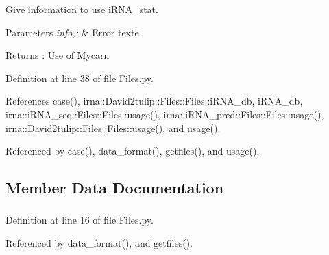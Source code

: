 \-Give information to use \hyperlink{namespaceirna_1_1iRNA__stat_1_1iRNA__stat}{i\-R\-N\-A\-\_\-stat}. 


\begin{DoxyParams}{\-Parameters}
{\em info,\-:} & \-Error texte \\
\hline
\end{DoxyParams}
\begin{DoxyReturn}{\-Returns}
\-: \-Use of \-Mycarn 
\end{DoxyReturn}


\-Definition at line 38 of file \-Files.\-py.



\-References case(), irna\-::\-David2tulip\-::\-Files\-::\-Files\-::i\-R\-N\-A\-\_\-db, i\-R\-N\-A\-\_\-db, irna\-::i\-R\-N\-A\-\_\-seq\-::\-Files\-::\-Files\-::usage(), irna\-::i\-R\-N\-A\-\_\-pred\-::\-Files\-::\-Files\-::usage(), irna\-::\-David2tulip\-::\-Files\-::\-Files\-::usage(), and usage().



\-Referenced by case(), data\-\_\-format(), getfiles(), and usage().



\subsection{\-Member \-Data \-Documentation}
\hypertarget{classirna_1_1iRNA__stat_1_1Files_1_1Files_a99f3e2f426de140f1bbd8e9d2cce91ca}{
\subsubsection[{exec\-\_\-inf}]{}}
\label{classirna_1_1iRNA__stat_1_1Files_1_1Files_a99f3e2f426de140f1bbd8e9d2cce91ca}


\-Definition at line 16 of file \-Files.\-py.



\-Referenced by data\-\_\-format(), and getfiles().

\hypertarget{classirna_1_1iRNA__stat_1_1Files_1_1Files_a32705d9dc58c6a688ba3c5c817ffc682}{
\subsubsection[{exp\-\_\-inf}]{}}
\label{classirna_1_1iRNA__stat_1_1Files_1_1Files_a32705d9dc58c6a688ba3c5c817ffc682}


